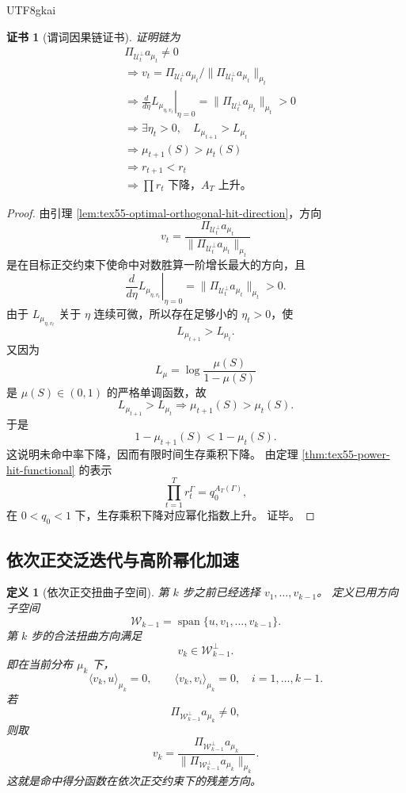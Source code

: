 \documentclass[12pt]{article}
\newtheorem{definition}{定义}[section]
\newtheorem{Certificate}{证书}[section]
\begin{document}
\begin{CJK*}{UTF8}{gkai}
\begin{Certificate}[谓词因果链证书]
\label{cert:tex55-orthogonal-power-improvement}
证明链为
\[
\begin{aligned}
  &\Pi_{\mathcal U_t^\perp}a_{\mu_t}\neq0\\
  &\Longrightarrow
  v_t=
  \Pi_{\mathcal U_t^\perp}a_{\mu_t}/
  \lVert\Pi_{\mathcal U_t^\perp}a_{\mu_t}\rVert_{\mu_t}\\
  &\Longrightarrow
  \left.
  \frac{d}{d\eta}L_{\mu_{\eta,v_t}}
  \right|_{\eta=0}
  =
  \lVert\Pi_{\mathcal U_t^\perp}a_{\mu_t}\rVert_{\mu_t}>0\\
  &\Longrightarrow
  \exists\eta_t>0,\quad L_{\mu_{t+1}}>L_{\mu_t}\\
  &\Longrightarrow
  \mu_{t+1}(S)>\mu_t(S)\\
  &\Longrightarrow
  r_{t+1}<r_t\\
  &\Longrightarrow
  \prod r_t\text{ 下降，}A_T\text{ 上升。}
\end{aligned}
\]
\end{Certificate}

\begin{proof}
由引理 \ref{lem:tex55-optimal-orthogonal-hit-direction}，方向
\[
  v_t
  =
  \frac{
  \Pi_{\mathcal U_t^\perp}a_{\mu_t}
  }{
  \lVert\Pi_{\mathcal U_t^\perp}a_{\mu_t}\rVert_{\mu_t}
  }
\]
是在目标正交约束下使命中对数胜算一阶增长最大的方向，且
\[
  \left.
  \frac{d}{d\eta}
  L_{\mu_{\eta,v_t}}
  \right|_{\eta=0}
  =
  \lVert\Pi_{\mathcal U_t^\perp}a_{\mu_t}\rVert_{\mu_t}
  >
  0.
\]
由于 \(L_{\mu_{\eta,v_t}}\) 关于 \(\eta\) 连续可微，所以存在足够小的
\(\eta_t>0\)，使
\[
  L_{\mu_{t+1}}>L_{\mu_t}.
\]
又因为
\[
  L_\mu=\log\frac{\mu(S)}{1-\mu(S)}
\]
是 \(\mu(S)\in(0,1)\) 的严格单调函数，故
\[
  L_{\mu_{t+1}}>L_{\mu_t}
  \Longrightarrow
  \mu_{t+1}(S)>\mu_t(S).
\]
于是
\[
  1-\mu_{t+1}(S)<1-\mu_t(S).
\]
这说明未命中率下降，因而有限时间生存乘积下降。
由定理 \ref{thm:tex55-power-hit-functional} 的表示
\[
  \prod_{t=1}^{T}r_t^\Gamma=q_0^{A_T(\Gamma)},
\]
在 \(0<q_0<1\) 下，生存乘积下降对应幂化指数上升。
证毕。
\end{proof}

\subsection{依次正交泛迭代与高阶幂化加速}
\label{subsec:tex55-sequential-orthogonal-iteration}

\begin{definition}[依次正交扭曲子空间]
\label{def:tex55-sequential-orthogonal-space}
第 \(k\) 步之前已经选择 \(v_1,\ldots,v_{k-1}\)。
定义已用方向子空间
\[
  \mathcal W_{k-1}
  =
  \operatorname{span}\{u,v_1,\ldots,v_{k-1}\}.
\]
第 \(k\) 步的合法扭曲方向满足
\[
  v_k\in\mathcal W_{k-1}^\perp.
\]
即在当前分布 \(\mu_k\) 下，
\[
  \langle v_k,u\rangle_{\mu_k}=0,
  \qquad
  \langle v_k,v_i\rangle_{\mu_k}=0,
  \quad i=1,\ldots,k-1.
\]
若
\[
  \Pi_{\mathcal W_{k-1}^\perp}a_{\mu_k}\neq0,
\]
则取
\[
  v_k
  =
  \frac{
  \Pi_{\mathcal W_{k-1}^\perp}a_{\mu_k}
  }{
  \lVert\Pi_{\mathcal W_{k-1}^\perp}a_{\mu_k}\rVert_{\mu_k}
  }.
\]
这就是命中得分函数在依次正交约束下的残差方向。
\end{definition}


\end{CJK*}
\end{document}
